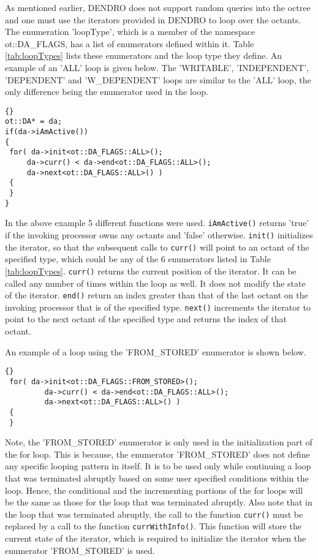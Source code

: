 \documentclass[10pt,reqno,a4paper]{report}
\numberwithin{equation}{section}
\begin{document}
As mentioned earlier, DENDRO does not support random queries into the octree and one must use the iterators provided in DENDRO to loop over the octants. The enumeration 'loopType', which is a member of the namespace ot::DA\_FLAGS, has a list of enumerators defined within it. Table \ref{tab:loopTypes} lists these enumerators and the loop type they define. 
An example of an 'ALL' loop is given below. The 'WRITABLE', 'INDEPENDENT', 'DEPENDENT'
and 'W\_DEPENDENT' loops are similar to the 'ALL' loop, the only difference being the enumerator used in the loop.

\begin{lstlisting}[frame=trbl, fontadjust]{}
ot::DA* = da;
if(da->iAmActive()) 
{
 for( da->init<ot::DA_FLAGS::ALL>(); 
     da->curr() < da->end<ot::DA_FLAGS::ALL>();
     da->next<ot::DA_FLAGS::ALL>() )
 {
 }
}
\end{lstlisting}

In the above example 5 different functions were used. \lstinline[basicstyle=\bfseries]!iAmActive()! returns 'true' if the invoking processor
owns any octants and 'false' otherwise. \lstinline[basicstyle=\bfseries]!init()! initializes the iterator, so that the subsequent calls to 
\lstinline[basicstyle=\bfseries]!curr()! will point to an octant of the specified type, which could be any of the 6 enumerators listed
 in Table \ref{tab:loopTypes}. \lstinline[basicstyle=\bfseries]!curr()! returns the current position of the iterator. It can be called any number of times within the loop as well. It does not modify the state of the iterator. \lstinline[basicstyle=\bfseries]!end()! return an index greater
  than that of the last octant on the invoking processor that is of the specified type. \lstinline[basicstyle=\bfseries]!next()! increments the 
  iterator to point to the next octant of the specified type and returns the index of that octant. 

An example of a loop using the 'FROM\_STORED' enumerator is shown below. 

\begin{lstlisting}[frame=trbl, fontadjust]{}
 for( da->init<ot::DA_FLAGS::FROM_STORED>();
 		 da->curr() < da->end<ot::DA_FLAGS::ALL>();
 		 da->next<ot::DA_FLAGS::ALL>() )
 {
 }
\end{lstlisting}

Note, the 'FROM\_STORED' enumerator is only used in the initialization part of the for loop. This is because, the enumerator 'FROM\_STORED' does not define any specific looping pattern in itself. It is to be used only while continuing a loop that was terminated abruptly based on some user specified conditions within the loop. Hence, the conditional and the incrementing portions of the for loops will be the same as those for the loop that was terminated abruptly. Also note that in the loop that was terminated abruptly, the call to the function \lstinline[basicstyle=\bfseries]!curr()! must be replaced by a call to the function \lstinline[basicstyle=\bfseries]!currWithInfo()!. This function will store the current state of the iterator, which is required to initialize the iterator when the enumerator 'FROM\_STORED' is used.
    
\end{document}
